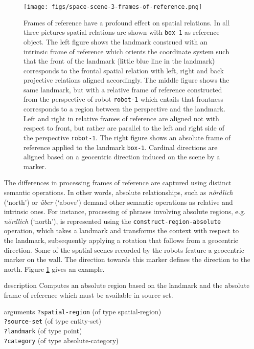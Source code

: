 \begin{figure}
\begin{center}
\texttt{[image: figs/space-scene-3-frames-of-reference.png]}
\end{center}
\caption[Spatial relations and frames of reference.]
{Frames of reference have a profound effect on spatial relations. In all three
pictures spatial relations are shown with {\footnotesize\tt box-1} as reference object. The left
figure shows the landmark construed with an intrinsic frame of reference which
orients the coordinate system such that the front of the landmark 
(little blue line in the landmark) corresponds to the frontal spatial relation with
left, right and back projective relations aligned accordingly. The middle figure
shows the same landmark, but with a relative frame of reference constructed
from the perspective of robot {\footnotesize\tt robot-1} which entails that frontness 
corresponds to a region between the perspective and the landmark. 
Left and right in relative frames of reference are aligned not with respect to
front, but rather are parallel to the left and right side of the perspective 
{\footnotesize\tt robot-1}.
The right figure shows an absolute frame of reference applied to the landmark 
{\footnotesize\tt box-1}. Cardinal directions are aligned based on a geocentric direction
induced on the scene by a marker.}
\label{f:frames-of-reference}
\end{figure}


The differences in processing frames of reference are captured using 
distinct semantic operations. In other words, absolute relationships, 
such as \textit{n\"ordlich} (`north') or \textit{\"uber}  (`above') demand other semantic 
operations as relative and intrinsic ones. For instance, 
processing of phrases involving absolute regions, e.g. \textit{n\"ordlich}
(`north'), is represented using the {\footnotesize\tt construct-region-absolute} operation, 
which takes a landmark and transforms the context with respect to the 
landmark, subsequently applying a rotation that follows from a geocentric direction. 
Some of the spatial scenes recorded by the robots feature
a geocentric marker on the wall. The direction towards this marker
defines the direction to the north. Figure \ref{f:frames-of-reference} 
gives an example.

\begin{explanation}{description}
Computes an absolute region based on the landmark
and the absolute frame of reference which must be available
in source set.
\end{explanation}
\begin{explanation}{arguments}
{\footnotesize\verb+?spatial-region+} (of type spatial-region) \\
{\footnotesize\verb+?source-set+} (of type entity-set) \\
{\footnotesize\verb+?landmark+} (of type point)\\
{\footnotesize\verb+?category+} (of type absolute-category)
\vspace{0.3cm}
\end{explanation}

